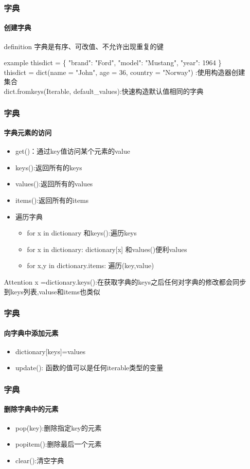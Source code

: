 \documentclass{beamer}
\begin{document}
\begin{frame}[t]
	\frametitle{字典}
	\framesubtitle{创建字典}
	\begin{block}{definition}
		字典是有序、可改值、不允许出现重复的键
	\end{block}
	\pause
	\begin{block}{example}
		thisdict = \{
		"brand": "Ford",
		"model": "Mustang",
		"year": 1964
		\}\\
		thisdict = dict(name = "John", age = 36, country = "Norway") :使用构造器创建集合\\
		dict.fromkeys(Iterable, default\_values):快速构造默认值相同的字典
	\end{block}

\end{frame}
\begin{frame}[t]
	\frametitle{字典}
	\framesubtitle{字典元素的访问}
	\begin{itemize}
		\item get()：通过key值访问某个元素的value
		\item keys():返回所有的keys
		\item values():返回所有的values
		\item items():返回所有的items
		\item 遍历字典
		      \begin{itemize}
			      \item for x in dictionary 和keys():遍历keys
			      \item for x in dictionary: dictionary[x] 和values()便利values
			      \item for x,y in dictionary.items: 遍历(key,value)
		      \end{itemize}

	\end{itemize}
	\begin{alertblock}{Attention}
		x =dictionary.keys():在获取字典的keys之后任何对字典的修改都会同步到keys列表,valuse和items也类似
	\end{alertblock}

\end{frame}
\begin{frame}[t]
	\frametitle{字典}
	\framesubtitle{向字典中添加元素}
	\begin{itemize}
		\item dictionary[keys]=values
		\item update(): 函数的值可以是任何iterable类型的变量
	\end{itemize}

\end{frame}
\begin{frame}[t]
	\frametitle{字典}
	\framesubtitle{删除字典中的元素}
	\begin{itemize}
		\item pop(key):删除指定key的元素
		\item popitem():删除最后一个元素
		\item clear():清空字典
	\end{itemize}
\end{frame}
\end{document}
